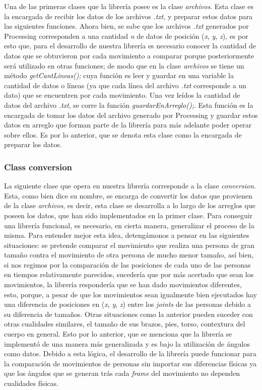 \documentclass[letterpaper]{article}
\begin{document}
\quad \quad Una de las primeras clases que la librería posee es la clase \textit{archivos}. Esta clase es la encargada de recibir los datos de los archivos \textit{.txt}, y preparar estos datos para las siguientes funciones.
Ahora bien, se sabe que los archivos \textit{.txt} generados por Processing corresponden a una cantidad \textit{n} de datos de posición (\textit{x}, \textit{y}, \textit{z}), es por esto que, para el desarrollo de nuestra
librería es necesario conocer la cantidad de datos que se obtuvieron por cada movimiento a comparar porque posteriormente será utilizado en otras funciones; de modo que en la clase \textit{archivos} se tiene un método \textit{getCantLineas();} 
cuya función es leer y guardar en una variable la cantidad de datos o líneas (ya que cada línea del archivo \textit{.txt} corresponde a un dato) que se encuentren por cada movimiento. 
Una vez leídos la cantidad de datos del archivo \textit{.txt}, se corre la función \textit{guardarEnArreglo();}. Esta función es la encargada de tomar los datos del archivo generado por Processing y guardar estos datos en arreglo que forman parte de la librería
para más adelante poder operar sobre ellos. Es por lo anterior, que se denota esta clase como la encargada de preparar los datos.

\subsubsection{Class conversion}

\quad \quad La siguiente clase que opera en nuestra librería corresponde a la clase \textit{conversion}. Esta, como bien dice su nombre, se encarga de convertir los datos que provienen de la clase \textit{archivos}, es decir, esta clase se desarrolla a lo largo
de los arreglos que poseen los datos, que han sido implementados en la primer clase. Para conseguir una librería funcional, es necesario, en cierta manera, generalizar el proceso de la misma. Para entender mejor esta idea, detengámonos a pensar en las siguientes situaciones:
se pretende comparar el movimiento que realiza una persona de gran tamaño contra el movimiento de otra persona de mucho menor tamaño, así bien, si nos regimos por la comparación de las posiciones de cada uno de las personas en tiempos relativamente parecidos, sucedería que por más acertado
que sean los movimientos, la librería respondería que se han dado movimientos diferentes, esto, porque, a pesar de que los movimientos sean igualmente bien ejecutados hay una diferencia de posiciones en (\textit{x}, \textit{y}, \textit{z}) entre los \textit{joints} de las personas debido a su diferencia de tamaños.
Otras situaciones como la anterior pueden suceder con otras cualidades similares, el tamaño de sus brazos, pies, torso, contextura del cuerpo en general. Esto por lo anterior, que se menciona que la librería se implementó de una manera más generalizada y es bajo la utilización de ángulos como datos. Debido a esta lógica,
el desarrollo de la librería puede funcionar para la comparación de movimientos de personas sin importar sus diferencias físicas ya que los ángulos que se generan trás cada \textit{frame} del movimiento no dependen cualidades físicas.\\
\end{document}
